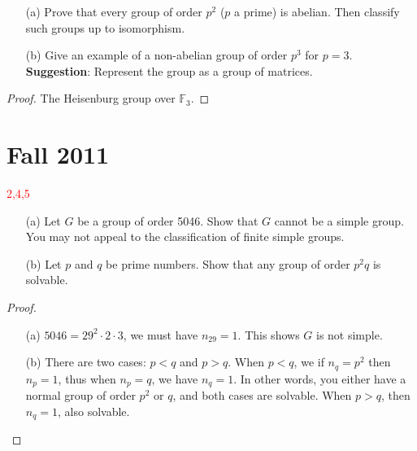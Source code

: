 \documentclass[openany]{book}
\newcommand{\F}{\mathbb{F}}
\begin{document}
\begin{prob}
    \begin{itemize}
        \item[(a)] Prove that every group of order \(p^2\) (\(p\) a prime) is abelian. Then classify such groups up to isomorphism.
        \item[(b)] Give an example of a non-abelian group of order \(p^3\) for \(p = 3\). \textbf{Suggestion}: Represent the group as a group of matrices.
    \end{itemize}
\end{prob}

\begin{proof}
    The Heisenburg group over $\F_3$.
\end{proof}





\chapter{Fall 2011}

\textcolor{red}{2,4,5}

\begin{prob}
    \begin{itemize}
        \item[(a)] Let \(G\) be a group of order 5046. Show that \(G\) cannot be a simple group. You may not appeal to the classification of finite simple groups.
        \item[(b)] Let \(p\) and \(q\) be prime numbers. Show that any group of order \(p^2q\) is solvable.
    \end{itemize}
\end{prob}
\begin{proof}
    \begin{itemize}
        \item[(a)] $5046=29^2\cdot 2\cdot 3$, we must have $n_{29}=1$. This shows $G$ is not simple.
        \item[(b)] There are two cases: $p<q$ and $p>q$. When $p<q$, we if $n_{q}=p^2$ then $n_p=1$, thus when $n_p=q$, we have $n_q=1$. In other words, you either have a normal group of order $p^2$ or $q$, and both cases are solvable. When $p>q$, then $n_q=1$, also solvable.
    \end{itemize}
\end{proof}
\end{document}
